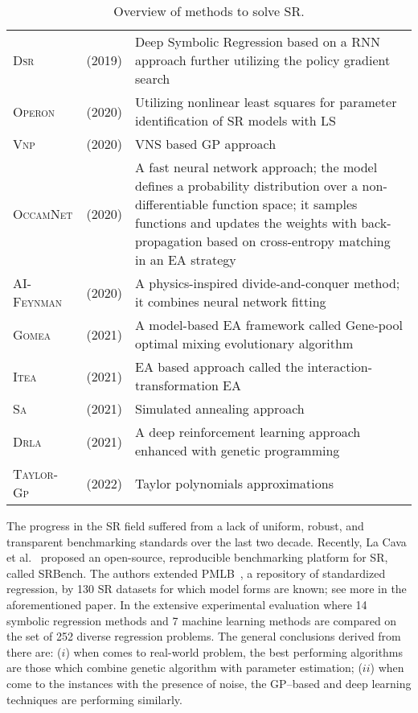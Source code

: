 \documentclass[a4paper,12pt]{elsarticle}
\begin{document}
\begin{table}[!ht]
{\begin{tabularx}{550pt}{l  l  X}
	       \textsc{Dsr}  & \cite{petersen2019deep} (2019) & Deep Symbolic Regression based on a RNN approach further utilizing the policy gradient search \\
	       \textsc{Operon} & \cite{kommenda2020parameter} (2020) &  Utilizing nonlinear least squares for parameter identification of SR models with LS \\
	       \textsc{Vnp}    & \cite{elleuch2020variable} (2020) & VNS based GP approach \\
	       \textsc{OccamNet} & \cite{costa2020fast} (2020) &   A fast neural network approach; the model defines a probability distribution over a non-differentiable function space; it samples functions and updates the weights with back-propagation  based on cross-entropy matching in an EA strategy	 \\
	       
	       \textsc{AI-Feynman} & \cite{udrescu2020ai} (2020) & A physics-inspired divide-and-conquer method; it  combines neural network fitting \\
	       \textsc{Gomea}  & \cite{virgolin2021improving} (2021)    & A model-based
	       EA framework called Gene-pool optimal mixing evolutionary algorithm \\
	       \textsc{Itea} & \cite{de2021interaction} (2021)   & EA based approach called the interaction-transformation EA   \\
	       \textsc{Sa} & \cite{kantor2021simulated} (2021) &  Simulated annealing approach \\
	       
         \textsc{Drla} & \cite{mundhenk2021symbolic} (2021)  &    A deep reinforcement learning approach enhanced with genetic programming \\
          \textsc{Taylor-Gp} &  \cite{he2022taylor} (2022)  &  Taylor polynomials approximations  \\ \hline
         

	\end{tabularx} }
		\caption{Overview of methods to solve SR.}
		\label{tab:gp-based}
	\end{table}
 
  
	The progress in the SR field suffered from a lack of uniform, robust, and transparent
	benchmarking standards over the last two decade. Recently, La Cava et al.~\cite{la2021contemporary} proposed an
	open-source, reproducible benchmarking platform for SR, called SRBench. The authors extended  PMLB~\cite{olson2017pmlb},  a repository of standardized regression, by 130 SR datasets for which model forms are known; see more in the aforementioned paper. In the extensive experimental evaluation  where 14
	symbolic regression methods and 7 machine learning methods are compared on the  set of 252 diverse
    regression problems. The general conclusions derived from there are: ($i$) when comes to real-world problem, the best performing algorithms are those which combine genetic algorithm with parameter estimation; ($ii$) when come to the instances with the presence of noise, the GP--based and deep learning techniques are performing similarly. 
    
\end{document}
